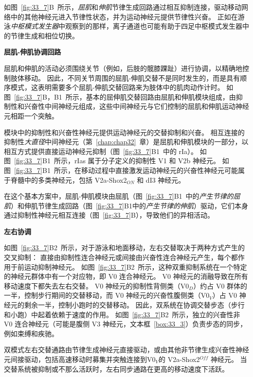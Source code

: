 如图~\ref{fig:33_7}B~所示，\textit{屈肌}和\textit{伸肌}节律生成回路通过相互抑制连接，驱动移动网络中的其他神经元进入节律性状态，并为运动神经元提供节律性兴奋。
正如在游泳\textit{中枢模式发生器}中观察到的那样，离子通道也可能有助于四足中枢模式发生器中的节律生成和相位切换。


\textbf{屈肌-伸肌协调回路}

屈肌和伸肌的活动必须围绕关节（例如，后肢的髋膝踝趾）进行协调，以精确地控制肢体移动。
因此，不同关节周围的屈肌-伸肌交替不是同时发生的，而是具有顺序模式，这表明需要多个屈肌-伸肌交替回路来为肢体中的肌肉动作计时。
如图~\ref{fig:33_7}B，B1~所示，基本的屈伸肌交替回路由屈肌和伸肌模块组成，由抑制性和兴奋性中间神经元组成，这些中间神经元与它们控制的屈肌和伸肌运动神经元相距一个突触。


模块中的抑制性和兴奋性神经元提供运动神经元的交替抑制和兴奋。
相互连接的抑制性\textit{大直径}中间神经元（第~\ref{chap:chap32}~章）是屈肌和伸肌模块的一部分，以相互方式提供直接运动神经元抑制（图~\ref{fig:33_7}B1~中的 rIa）。
如图~\ref{fig:33_7}B1~所示，rIas 属于分子定义的抑制性 V1 和 V2b 神经元。
如图~\ref{fig:33_7}B1~所示，在移动过程中直接激发运动神经元的兴奋性神经元可能属于脊髓中的多类神经元，包括 V2a-Shox2$_{ON}$ 和 dI3 神经元。


在这个基本方案中，屈肌-伸肌模块由屈肌（图~\ref{fig:33_7}B1~中的\textit{产生节律的屈肌}）和伸肌节律生成回路（图~\ref{fig:33_7}B1中的\textit{产生节律的伸肌}）驱动，它们本身通过抑制性神经元相互连接（图~\ref{fig:33_7}B），导致他们的异相活动。


\textbf{左右协调}

如图~\ref{fig:33_7}B2~所示，对于游泳和地面移动，左右交替取决于两种方式产生的交叉抑制：
直接由抑制性连合神经元或间接由兴奋性连合神经元产生，每个都作用于前运动抑制神经元。
如图~\ref{fig:33_7}B2~所示，这种双重抑制系统在一个特定的神经元群体中有一个对应物，即 V0 连合神经元。
V0 神经元的消融导致在所有移动速度下都失去左右交替。
V0 神经元的抑制性背侧类（V0$_D$）约占 V0 群体的一半，控制步行期间的交替移动，而 V0 神经元的兴奋性腹侧类（V0$_V$）占 V0 神经元的剩余一半，控制小跑时的交替移动。
因此，双系统在协调交替步态（步行和小跑）中起着依赖于速度的作用。
如图~\ref{fig:33_7}B2~所示，独立的兴奋性非 V0 连合神经元（可能是腹侧 V3 神经元，文本框~\ref{box:33_3}）负责步态的同步，例如束缚和疾驰。


双模式左右交替通路由节律生成神经元直接驱动，或由其他非节律生成兴奋性神经元间接驱动，包括高速移动时募集并突触连接到V0$_V$的 V2a-Shox2$^{Off}$ 神经元。
当交替系统被抑制或不那么活跃时，左右同步通路在更高的移动速度下活跃。


